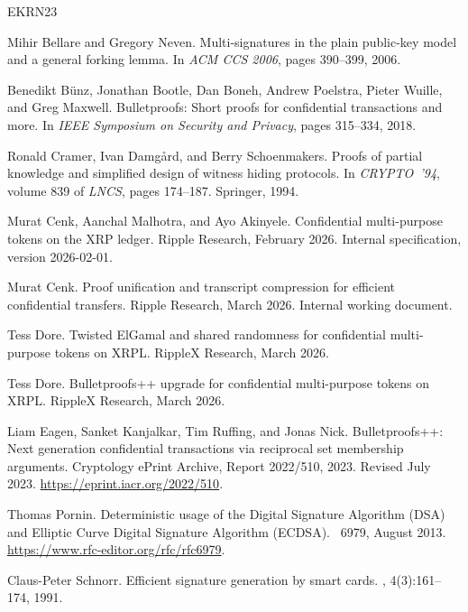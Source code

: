 \documentclass[11pt]{article}
\theoremstyle{definition}
\begin{document}
\providecommand{\etalchar}[1]{$^{#1}$}
\begin{thebibliography}{EKRN23}

Mihir Bellare and Gregory Neven.
\newblock Multi-signatures in the plain public-key model and a general
  forking lemma.
\newblock In {\em ACM CCS 2006}, pages 390--399, 2006.

\bibitem[BBB{\etalchar{+}}18]{Bunz2018bulletproofs}
Benedikt B{\"u}nz, Jonathan Bootle, Dan Boneh, Andrew Poelstra, Pieter Wuille,
  and Greg Maxwell.
\newblock Bulletproofs: Short proofs for confidential transactions and more.
\newblock In {\em IEEE Symposium on Security and Privacy}, pages 315--334,
  2018.

Ronald Cramer, Ivan Damg{\aa}rd, and Berry Schoenmakers.
\newblock Proofs of partial knowledge and simplified design of witness hiding
  protocols.
\newblock In {\em CRYPTO~'94}, volume 839 of {\em LNCS}, pages 174--187.
  Springer, 1994.

Murat Cenk, Aanchal Malhotra, and Ayo Akinyele.
\newblock Confidential multi-purpose tokens on the {XRP} ledger.
\newblock Ripple Research, February 2026.
\newblock Internal specification, version 2026-02-01.

Murat Cenk.
\newblock Proof unification and transcript compression for efficient
  confidential transfers.
\newblock Ripple Research, March 2026.
\newblock Internal working document.

Tess Dore.
\newblock Twisted {ElGamal} and shared randomness for confidential
  multi-purpose tokens on {XRPL}.
\newblock RippleX Research, March 2026.

Tess Dore.
\newblock Bulletproofs++ upgrade for confidential multi-purpose tokens
  on {XRPL}.
\newblock RippleX Research, March 2026.

Liam Eagen, Sanket Kanjalkar, Tim Ruffing, and Jonas Nick.
\newblock Bulletproofs++: Next generation confidential transactions via
  reciprocal set membership arguments.
\newblock Cryptology ePrint Archive, Report 2022/510, 2023.
\newblock Revised July 2023. \url{https://eprint.iacr.org/2022/510}.

Thomas Pornin.
\newblock Deterministic usage of the {Digital Signature Algorithm (DSA)}
  and {Elliptic Curve Digital Signature Algorithm (ECDSA)}.
~6979, August 2013.
\newblock \url{https://www.rfc-editor.org/rfc/rfc6979}.

Claus-Peter Schnorr.
\newblock Efficient signature generation by smart cards.
, 4(3):161--174, 1991.

\end{thebibliography}
\end{document}
